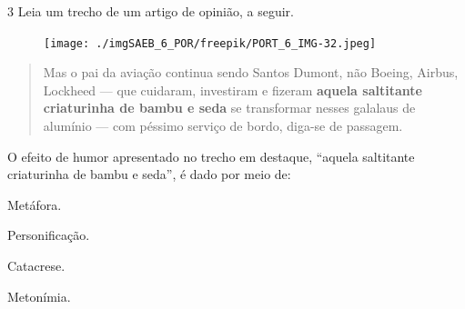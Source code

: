 \num{3} Leia um trecho de um artigo de opinião, a seguir.

\begin{figure}[h!]
\centering\texttt{[image: ./imgSAEB\_6\_POR/freepik/PORT\_6\_IMG-32.jpeg]}
\end{figure}

\begin{quote}
Mas o pai da aviação continua sendo Santos Dumont, não Boeing, Airbus,
Lockheed — que cuidaram, investiram e fizeram \textbf{aquela
saltitante criaturinha de bambu e seda} se transformar nesses galalaus
de alumínio — com péssimo serviço de bordo, diga-se de passagem.

\end{quote}

\noindent O efeito de humor apresentado no trecho em destaque, ``aquela saltitante
criaturinha de bambu e seda'', é dado por meio de:

\begin{escolha}
\item Metáfora.
\item Personificação.
\item Catacrese.
\item Metonímia.
\end{escolha}




